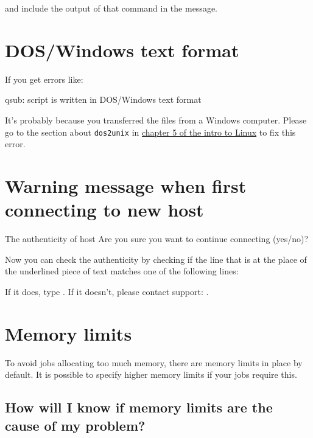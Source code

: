 and include the output of that command in the message.
\fi

\section{DOS/Windows text format}

If you get errors like:

\begin{prompt}
qsub:  script is written in DOS/Windows text format
\end{prompt}

It's probably because you transferred the files from a Windows computer.
Please go to the section about \verb|dos2unix| in \href{\LinuxManualURL#sec:dos2unix}{chapter 5 of the intro to Linux}
to fix this error.

\section{Warning message when first connecting to new host}
\label{sec:warning-message-new-host}

\ifmacORlinux
\begin{prompt}
The authenticity of host %
Are you sure you want to continue connecting (yes/no)?
\end{prompt}

Now you can check the authenticity by checking if the line that is at the place
of the underlined piece of text matches one of the following lines:
\begin{prompt}
\end{prompt}

If it does, type  . If it doesn't, please contact support: \hpcinfo.
\else
\firsttimeconnection
\fi

\section{Memory limits}

To avoid jobs allocating too much memory, there are memory limits in place by default.
It is possible to specify higher memory limits if your jobs require this.

\subsection{How will I know if memory limits are the cause of my problem?}

